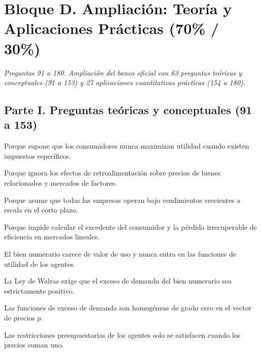 \section*{Bloque D. Ampliación: Teoría y Aplicaciones Prácticas (70\% / 30\%)}

\noindent\textit{Preguntas 91 a 180. Ampliación del banco oficial con 63 preguntas teóricas y conceptuales (91 a 153) y 27 aplicaciones cuantitativas prácticas (154 a 180).}

\subsection*{Parte I. Preguntas teóricas y conceptuales (91 a 153)}

\begin{opts}
    \item Porque supone que los consumidores nunca maximizan utilidad cuando existen impuestos específicos.
    \item Porque ignora los efectos de retroalimentación sobre precios de bienes relacionados y mercados de factores.
    \item Porque asume que todas las empresas operan bajo rendimientos crecientes a escala en el corto plazo.
    \item Porque impide calcular el excedente del consumidor y la pérdida irrecuperable de eficiencia en mercados lineales.
\end{opts}

\begin{opts}
    \item El bien numerario carece de valor de uso y nunca entra en las funciones de utilidad de los agentes.
    \item La Ley de Walras exige que el exceso de demanda del bien numerario sea estrictamente positivo.
    \item Las funciones de exceso de demanda son homogéneas de grado cero en el vector de precios $p$.
    \item Las restricciones presupuestarias de los agentes solo se satisfacen cuando los precios suman uno.
\end{opts}

